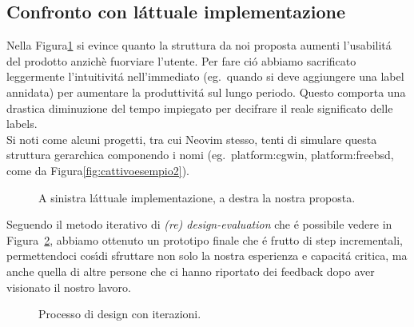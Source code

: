 \documentclass[12pt]{article} %
\begin{document}
\subsection{Confronto con l\'attuale implementazione}
Nella Figura\ref{fig:confronto} si evince quanto la struttura da noi proposta aumenti l'usabilit\'a del prodotto anzich\`e fuorviare l'utente. Per fare ci\'o abbiamo sacrificato leggermente l'intuitivit\'a nell'immediato (eg.\ quando si deve aggiungere una label annidata) per aumentare la produttivit\'a sul lungo periodo. Questo comporta una drastica diminuzione del tempo impiegato per decifrare il reale significato delle labels.\\
Si noti come alcuni progetti, tra cui Neovim stesso, tenti di simulare questa struttura gerarchica componendo i nomi (eg.\ platform:cgwin, platform:freebsd, come da Figura\ref{fig:cattivoesempio2}).

\begin{figure}[H]
\caption{A sinistra l\'attuale implementazione, a destra la nostra proposta.}
\label{fig:confronto}
\end{figure}

Seguendo il metodo iterativo di \emph{(re) design-evaluation} che \'e possibile vedere in Figura~\ref{fig:ciclo}, abbiamo ottenuto un prototipo finale che \'e frutto di step incrementali, permettendoci cos\'\i di sfruttare non solo la nostra esperienza e capacit\'a critica, ma anche quella di altre persone che ci hanno riportato dei feedback dopo aver visionato il nostro lavoro.

\begin{figure}[H]
\caption{Processo di design con iterazioni.}
\label{fig:ciclo}
\end{figure}
\end{document}
